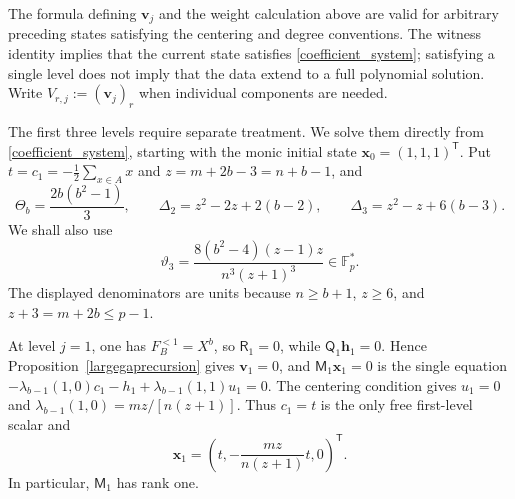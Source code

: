 \documentclass[10pt,a4paper]{amsart}
\newcommand{\F}{\mathbb{F}_p}
\begin{document}
The formula defining $\mathbf v_j$ and the weight calculation above
are valid for arbitrary preceding states satisfying the centering and
degree conventions.  The witness identity implies that the current state satisfies
\eqref{coefficient_system}; satisfying a single level does not imply
that the data extend to a full polynomial solution.
Write $V_{r,j}:=(\mathbf v_j)_r$ when individual components are needed.

The first three levels require separate treatment.  We solve them
directly from
\eqref{coefficient_system}, starting with the monic initial state
$\mathbf x_0=(1,1,1)^{\mathsf T}$.  Put
$t=c_1=-\frac12\sum_{x\in A}x$ and $z=m+2b-3=n+b-1$, and
\begin{equation*}
 \Theta_b=\frac{2b(b^2-1)}3,\qquad
 \Delta_2=z^2-2z+2(b-2),\qquad
 \Delta_3=z^2-z+6(b-3).
\end{equation*}
We shall also use
\begin{equation}\label{vartheta3def}
 \vartheta_3=\frac{8(b^2-4)(z-1)z}{n^3(z+1)^3}\in\F^*.
\end{equation}
The displayed denominators are units because $n\ge b+1$, $z\ge6$,
and $z+3=m+2b\le p-1$.

At level $j=1$, one has $F_B^{<1}=X^b$, so $\mathsf R_1=0$,
while $\mathsf Q_1\mathbf h_1=0$.  Hence Proposition~\ref{largegaprecursion}
gives $\mathbf v_1=0$, and $\mathsf M_1\mathbf x_1=0$ is the single equation
$-\lambda_{b-1}(1,0)c_1-h_1+\lambda_{b-1}(1,1)u_1=0$.
The centering condition gives $u_1=0$ and
$\lambda_{b-1}(1,0)=mz/[n(z+1)]$.  Thus $c_1=t$ is the only free first-level scalar and
\begin{equation}\label{h1formula}
 \mathbf x_1=
 \left(t,-\frac{mz}{n(z+1)}t,0\right)^{\mathsf T}.
\end{equation}
In particular, $\mathsf M_1$ has rank one.
\end{document}
